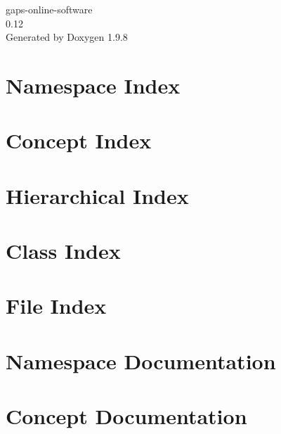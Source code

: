 \documentclass[twoside]{book}
\newcommand{\+}{\discretionary{\mbox{\scriptsize$\hookleftarrow$}}{}{}}
\newcommand{\clearemptydoublepage}{%
    \newpage{\pagestyle{empty}\cleardoublepage}%
  }
\begin{document}
  \raggedbottom
    \hypersetup{pageanchor=false,
                bookmarksnumbered=true,
                pdfencoding=unicode
               }
  \begin{titlepage}
  \vspace*{7cm}
  \begin{center}%
  {\Large gaps-\/online-\/software}\\
  [1ex]\large 0.\+12 \\
  \vspace*{1cm}
  {\large Generated by Doxygen 1.9.8}\\
  \end{center}
  \end{titlepage}
  \clearemptydoublepage
  \tableofcontents
  \clearemptydoublepage
  \hypersetup{pageanchor=true}


\chapter{Namespace Index}

\chapter{Concept Index}

\chapter{Hierarchical Index}

\chapter{Class Index}

\chapter{File Index}

\chapter{Namespace Documentation}


\chapter{Concept Documentation}

\end{document}

